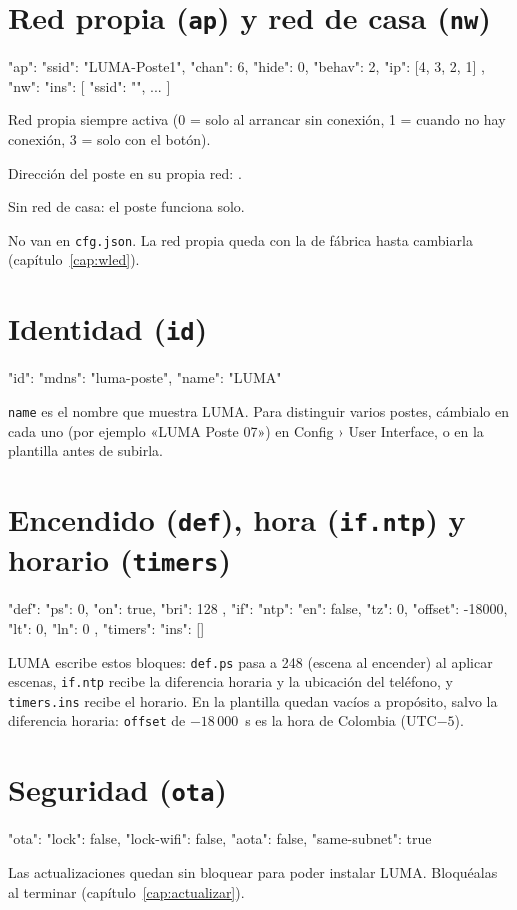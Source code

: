 \section{Red propia (\texttt{ap}) y red de casa (\texttt{nw})}
\begin{codigo}
"ap": { "ssid": "LUMA-Poste1", "chan": 6, "hide": 0, "behav": 2, "ip": [4, 3, 2, 1] },
"nw": { "ins": [ { "ssid": "", ... } ] }
\end{codigo}
\begin{description}[leftmargin=1.5em]
\item[\texttt{behav: 2}] Red propia siempre activa (0 = solo al arrancar sin conexión, 1 = cuando no hay conexión, 3 = solo con el botón).
\item[\texttt{ip}] Dirección del poste en su propia red: .
\item[\texttt{nw.ins[0].ssid} vacío] Sin red de casa: el poste funciona solo.
\item[Contraseñas] No van en \texttt{cfg.json}. La red propia queda con la de fábrica hasta cambiarla (capítulo~\ref{cap:wled}).
\end{description}

\section{Identidad (\texttt{id})}
\begin{codigo}
"id": { "mdns": "luma-poste", "name": "LUMA" }
\end{codigo}
\texttt{name} es el nombre que muestra LUMA. Para distinguir varios postes, cámbialo en cada uno (por ejemplo «LUMA Poste 07») en Config › User Interface, o en la plantilla antes de subirla.

\section{Encendido (\texttt{def}), hora (\texttt{if.ntp}) y horario (\texttt{timers})}
\begin{codigo}
"def": { "ps": 0, "on": true, "bri": 128 },
"if":  { "ntp": { "en": false, "tz": 0, "offset": -18000, "lt": 0, "ln": 0 } },
"timers": { "ins": [] }
\end{codigo}
LUMA escribe estos bloques: \texttt{def.ps} pasa a 248 (escena al encender) al aplicar escenas, \texttt{if.ntp} recibe la diferencia horaria y la ubicación del teléfono, y \texttt{timers.ins} recibe el horario. En la plantilla quedan vacíos a propósito, salvo la diferencia horaria: \texttt{offset} de $-18\,000$~s es la hora de Colombia (UTC$-5$).

\section{Seguridad (\texttt{ota})}
\begin{codigo}
"ota": { "lock": false, "lock-wifi": false, "aota": false, "same-subnet": true }
\end{codigo}
Las actualizaciones quedan sin bloquear para poder instalar LUMA. Bloquéalas al terminar (capítulo~\ref{cap:actualizar}).
